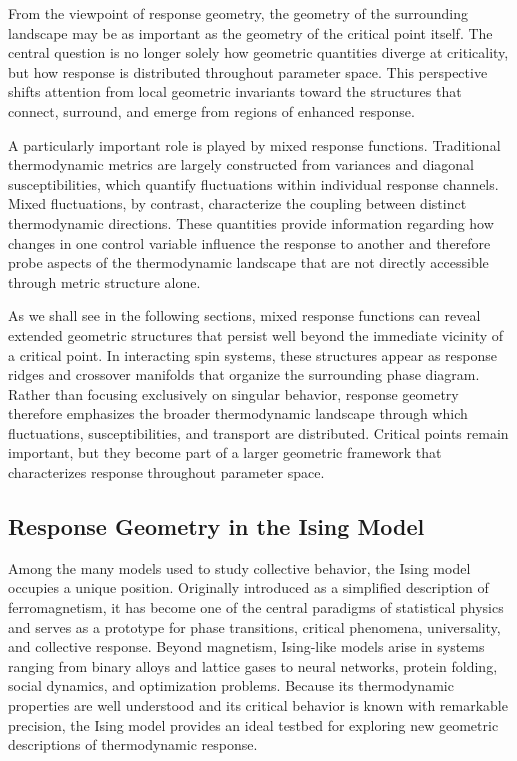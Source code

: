 From the viewpoint of response geometry, the geometry of the surrounding landscape may be as important as the geometry of the critical point itself. The central question is no longer solely how geometric quantities diverge at criticality, but how response is distributed throughout parameter space. This perspective shifts attention from local geometric invariants toward the structures that connect, surround, and emerge from regions of enhanced response.

A particularly important role is played by mixed response functions. Traditional thermodynamic metrics are largely constructed from variances and diagonal susceptibilities, which quantify fluctuations within individual response channels. Mixed fluctuations, by contrast, characterize the coupling between distinct thermodynamic directions. These quantities provide information regarding how changes in one control variable influence the response to another and therefore probe aspects of the thermodynamic landscape that are not directly accessible through metric structure alone.

As we shall see in the following sections, mixed response functions can reveal extended geometric structures that persist well beyond the immediate vicinity of a critical point. In interacting spin systems, these structures appear as response ridges and crossover manifolds that organize the surrounding phase diagram. Rather than focusing exclusively on singular behavior, response geometry therefore emphasizes the broader thermodynamic landscape through which fluctuations, susceptibilities, and transport are distributed. Critical points remain important, but they become part of a larger geometric framework that characterizes response throughout parameter space.


\subsection{Response Geometry in the Ising Model}

Among the many models used to study collective behavior, the Ising
model occupies a unique position. Originally introduced as a simplified
description of ferromagnetism, it has become one of the central
paradigms of statistical physics and serves as a prototype for phase
transitions, critical phenomena, universality, and collective response.
Beyond magnetism, Ising-like models arise in systems ranging from
binary alloys and lattice gases to neural networks, protein folding,
social dynamics, and optimization problems. Because its thermodynamic
properties are well understood and its critical behavior is known with
remarkable precision, the Ising model provides an ideal testbed for
exploring new geometric descriptions of thermodynamic response.

